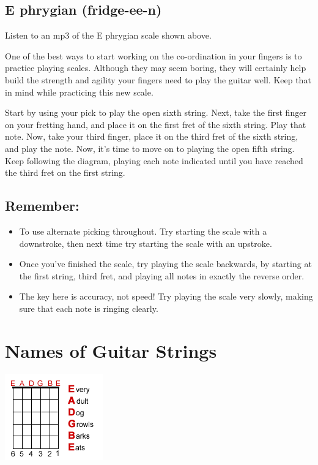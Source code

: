 \subsection{E phrygian (fridge-ee-n)}

Listen to an mp3 of the E phrygian scale shown above.

One of the best ways to start working on the co-ordination in your fingers is to practice playing scales. Although they may seem boring, they will certainly help build the strength and agility your fingers need to play the guitar well. Keep that in mind while practicing this new scale.

Start by using your pick to play the open sixth string. Next, take the first finger on your fretting hand, and place it on the first fret of the sixth string. Play that note. Now, take your third finger, place it on the third fret of the sixth string, and play the note. Now, it's time to move on to playing the open fifth string. Keep following the diagram, playing each note indicated until you have reached the third fret on the first string.

\subsection{Remember:}
%
\begin{itemize}
\item To use alternate picking throughout. Try starting the scale with a downstroke, then next time try starting the scale with an upstroke.
\item Once you've finished the scale, try playing the scale backwards, by starting at the first string, third fret, and playing all notes in exactly the reverse order.
\item The key here is accuracy, not speed! Try playing the scale very slowly, making sure that each note is ringing clearly.
\end{itemize}

\section{Names of Guitar Strings}
\includegraphics{parttwo/openstrings.png}

